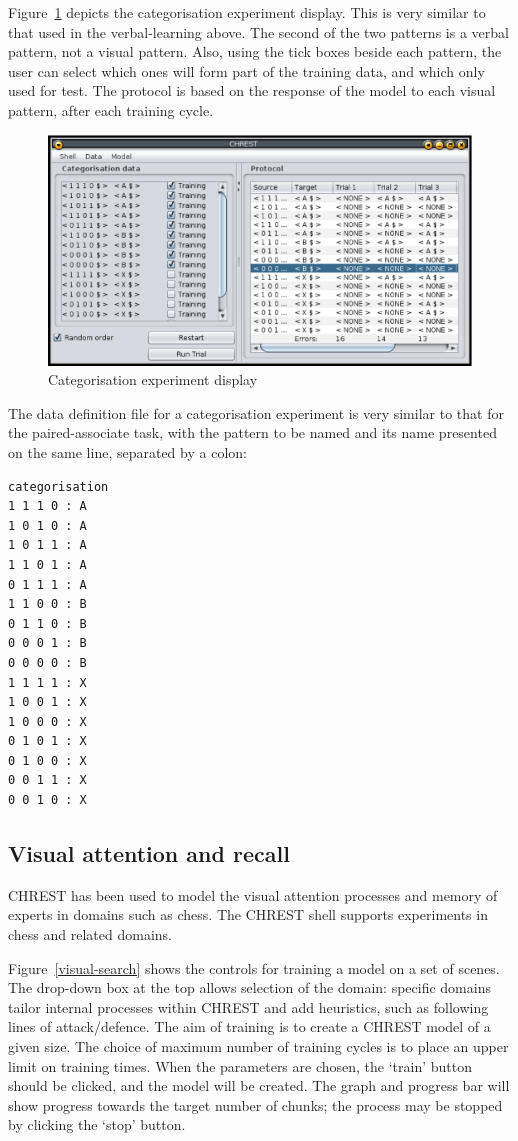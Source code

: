 \documentclass{article}
\begin{document}
Figure~\ref{categorisation} depicts the categorisation experiment display.
This is very similar to that used in the verbal-learning above.  The second of
the two patterns is a verbal pattern, not a visual pattern.  Also, using the
tick boxes beside each pattern, the user can select which ones will form part
of the training data, and which only used for test.  The protocol is based on
the response of the model to each visual pattern, after each training cycle.

\begin{figure}
\includegraphics[width=\textwidth]{images/categorisation.eps}
\caption{Categorisation experiment display}
\label{categorisation}
\end{figure}

The data definition file for a categorisation experiment is very similar to
that for the paired-associate task, with the pattern to be named and its name
presented on the same line, separated by a colon:

\begin{verbatim}
categorisation 
1 1 1 0 : A 
1 0 1 0 : A 
1 0 1 1 : A 
1 1 0 1 : A 
0 1 1 1 : A 
1 1 0 0 : B 
0 1 1 0 : B 
0 0 0 1 : B 
0 0 0 0 : B 
1 1 1 1 : X 
1 0 0 1 : X 
1 0 0 0 : X 
0 1 0 1 : X 
0 1 0 0 : X 
0 0 1 1 : X 
0 0 1 0 : X 
\end{verbatim}

\subsection{Visual attention and recall}

CHREST has been used to model the visual attention processes and memory of
experts in domains such as chess.  The CHREST shell supports experiments in
chess and related domains. 

Figure~\ref{visual-search} shows the controls for training a model on a set of
scenes.  The drop-down box at the top allows selection of the domain: specific
domains tailor internal processes within CHREST and add heuristics, such as
following lines of attack/defence.  The aim of training is to create a CHREST
model of a given size.  The choice of maximum number of training cycles is to
place an upper limit on training times.  When the parameters are chosen, the
`train' button should be clicked, and the model will be created.  The graph and
progress bar will show progress towards the target number of chunks; the
process may be stopped by clicking the `stop' button.
\end{document}

